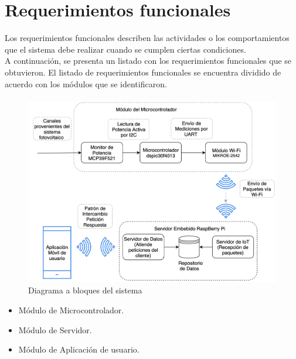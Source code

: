 \section{Requerimientos funcionales}
Los requerimientos funcionales describen las actividades o los comportamientos que el sistema debe realizar cuando se cumplen ciertas condiciones.
\\
A continuación, se presenta un listado con los requerimientos funcionales que se obtuvieron.
El listado de requerimientos funcionales se encuentra dividido de acuerdo con los módulos que se identificaron.

\paragraph{}
\begin{figure}[H]
	\centering
	\includegraphics[scale=.4]{Capitulo3/img/diagramabloques.png}
	\caption{Diagrama a bloques del sistema}
	\label{fig:diagrama_dispMonitoreo}
\end{figure}

\begin{itemize}
	\item Módulo de Microcontrolador.
	\item Módulo de Servidor.
	\item Módulo de Aplicación de usuario.
\end{itemize}


